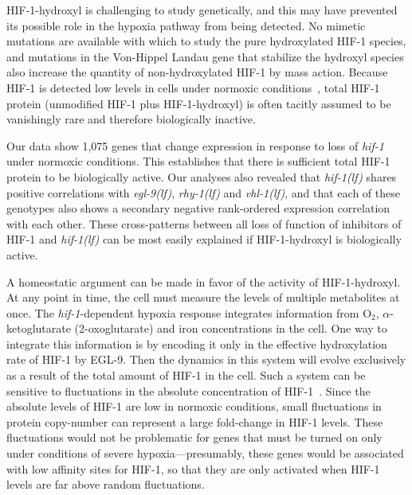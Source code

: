 \documentclass[9pt,twocolumn,twoside,lineno]{pnas-new}
\newcommand{\gene}[1]{\emph{#1}}
\newcommand{\egl}{\emph{\mbox{egl-9}(lf)}}
\newcommand{\rhy}{\emph{\mbox{rhy-1}(lf)}}
\newcommand{\vhl}{\emph{\mbox{vhl-1}(lf)}}
\newcommand{\hif}{\emph{\mbox{hif-1(lf)}}}
\newcommand{\eglp}{EGL-9}
\newcommand{\hifp}{HIF-1}
\newcommand{\hifn}{1,075}
\begin{document}
\hifp{}-hydroxyl is challenging to study genetically, and this may have prevented
its possible role in the hypoxia pathway from being detected. No mimetic
mutations are available with which to study the pure hydroxylated \hifp{} species,
and mutations in the Von-Hippel Landau gene that stabilize the hydroxyl species
also increase the quantity of non-hydroxylated \hifp{} by mass action. Because
\hifp{} is detected low levels in cells under normoxic conditions~\cite{Wang1993},
total \hifp{} protein (unmodified \hifp{} plus \hifp{}-hydroxyl) is often tacitly
assumed to be vanishingly rare and therefore biologically inactive.

%
Our data show \hifn{} genes that change expression in response to loss of
\gene{hif-1} under normoxic conditions. This establishes that there is sufficient
total \hifp{} protein to be biologically active. Our analyses also revealed that
\hif{} shares positive correlations with \egl{}, \rhy{} and \vhl{}, and that each
of these genotypes also shows a secondary negative rank-ordered expression
correlation with each other. These cross-patterns between all loss of function
of inhibitors of \hifp{} and \hif{} can be most easily explained if
\hifp{}-hydroxyl is biologically active.

A homeostatic argument can be made in favor of the activity of \hifp{}-hydroxyl.
At any point in time, the cell must measure the levels of multiple metabolites
at once. The \gene{hif-1}-dependent hypoxia response integrates information from
O$_2$, $\alpha$-ketoglutarate (2-oxoglutarate) and iron concentrations in the
cell. One way to integrate this information is by encoding it only in the
effective hydroxylation rate of \hifp{} by \eglp{}. Then the dynamics in this
system will evolve exclusively as a result of the total amount of \hifp{} in the
cell. Such a system can be sensitive to fluctuations in the absolute
concentration of \hifp{}~\cite{Goentoro2009a}. Since the absolute levels of
\hifp{} are low in normoxic conditions, small fluctuations in protein copy-number
can represent a large fold-change in \hifp{} levels. These fluctuations would
not be problematic for genes that must be turned on only under conditions of
severe hypoxia---presumably, these genes would be associated with low affinity
sites for \hifp{}, so that they are only activated when \hifp{} levels are far
above random fluctuations.
\end{document}
